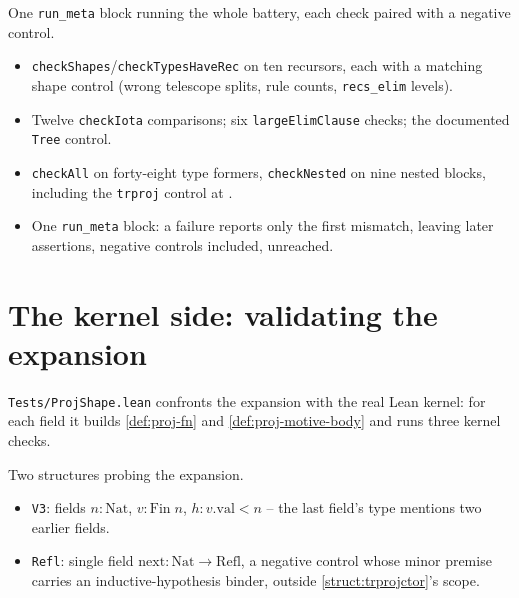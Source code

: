 \begin{example}
  \label{test:iotashape-run}
  \leanok

   One \texttt{run\_meta} block running the whole battery, each check paired with a
  negative control.
  \begin{itemize}
  \item \texttt{checkShapes}/\texttt{checkTypesHaveRec} on ten recursors, each with a matching
        shape control (wrong telescope splits, rule counts, \texttt{recs\_elim} levels).
  \item Twelve \texttt{checkIota} comparisons; six \texttt{largeElimClause} checks; the documented
        \texttt{Tree} control.
  \item \texttt{checkAll} on forty-eight type formers, \texttt{checkNested} on nine nested blocks,
        including the \texttt{trproj} control at .
  \item {} One \texttt{run\_meta} block: a failure reports only the first mismatch,
        leaving later assertions, negative controls included, unreached.
  \end{itemize}
\end{example}

\section{The kernel side: validating the expansion}

\texttt{Tests/ProjShape.lean} confronts the expansion with the real Lean kernel: for each field it
builds \ref{def:proj-fn} and \ref{def:proj-motive-body} and runs three kernel checks.

\begin{example}
  \label{def:projshape-fixtures}
  \leanok

   Two structures probing the expansion.
  \begin{itemize}
  \item \texttt{V3}: fields $n:\mathrm{Nat}$, $v:\mathrm{Fin}\;n$, $h:v.\mathrm{val}<n$ -- the last
        field's type mentions two earlier fields.
  \item \texttt{Refl}: single field $\mathrm{next}:\mathrm{Nat}\to\mathrm{Refl}$, a negative
        control whose minor premise carries an inductive-hypothesis binder, outside
        \ref{struct:trprojctor}'s scope.
  \end{itemize}
\end{example}

